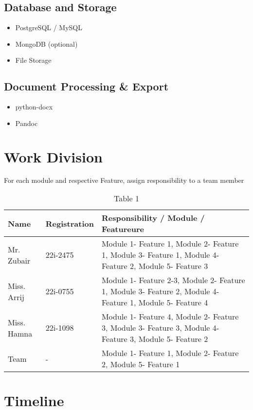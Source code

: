 \subsection*{Database and Storage}
\begin{itemize}
    \item PostgreSQL / MySQL 
    \item MongoDB (optional) 
    \item File Storage 
\end{itemize}

\subsection*{Document Processing \& Export}
\begin{itemize}
    \item python-docx 
    \item Pandoc 
\end{itemize}

\section{Work Division}
For each module and respective Feature, assign responsibility to a team member

\begin{table}[!ht]
\caption{Table 1}
\centering
\small
\begin{tabular}{|p{3cm}|p{2cm}|p{9cm}|}
\hline
\textbf{Name} & \textbf{Registration} & \textbf{Responsibility / Module / Featureure} \\ \hline
Mr. Zubair & 22i-2475 & Module 1- Feature 1, Module 2- Feature 1, Module 3- Feature 1, Module 4- Feature 2, Module 5- Feature 3  \\ \hline  
Miss. Arrij & 22i-0755 & Module 1- Feature 2-3, Module 2- Feature 1, Module 3- Feature 2, Module 4- Feature 1, Module 5- Feature 4  \\ \hline  
Miss. Hamna & 22i-1098 & Module 1- Feature 4, Module 2- Feature 3, Module 3- Feature 3, Module 4- Feature 3, Module 5- Feature 2 \\ \hline
Team & - & Module 1- Feature 1, Module 2- Feature 2, Module 5- Feature 1   \\ \hline  
\end{tabular}
\end{table}

\section{Timeline}


